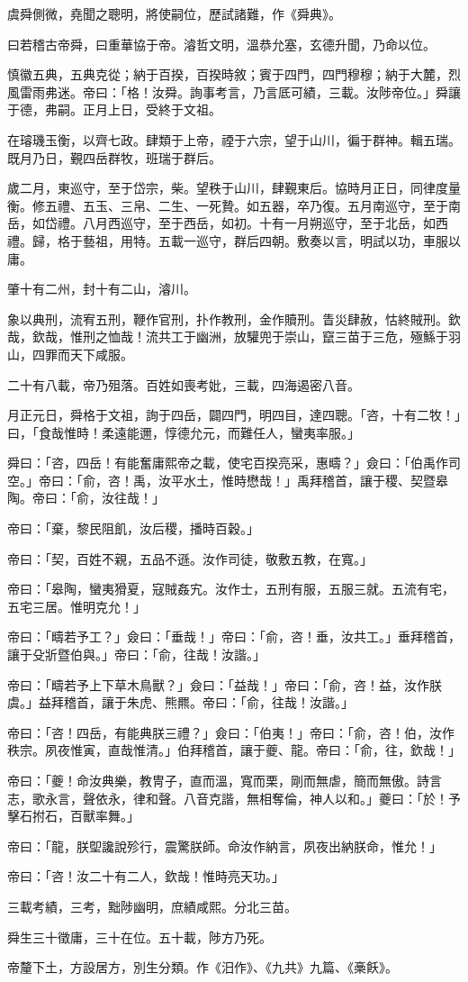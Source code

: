 
\begin{pinyinscope}
虞舜側微，堯聞之聰明，將使嗣位，歷試諸難，作《舜典》。

曰若稽古帝舜，曰重華協于帝。濬哲文明，溫恭允塞，玄德升聞，乃命以位。

慎徽五典，五典克從；納于百揆，百揆時敘；賓于四門，四門穆穆；納于大麓，烈風雷雨弗迷。帝曰：「格！汝舜。詢事考言，乃言厎可績，三載。汝陟帝位。」舜讓于德，弗嗣。正月上日，受終于文祖。

在璿璣玉衡，以齊七政。肆類于上帝，禋于六宗，望于山川，徧于群神。輯五瑞。既月乃日，覲四岳群牧，班瑞于群后。

歲二月，東巡守，至于岱宗，柴。望秩于山川，肆覲東后。協時月正日，同律度量衡。修五禮、五玉、三帛、二生、一死贄。如五器，卒乃復。五月南巡守，至于南岳，如岱禮。八月西巡守，至于西岳，如初。十有一月朔巡守，至于北岳，如西禮。歸，格于藝祖，用特。五載一巡守，群后四朝。敷奏以言，明試以功，車服以庸。

肇十有二州，封十有二山，濬川。

象以典刑，流宥五刑，鞭作官刑，扑作教刑，金作贖刑。眚災肆赦，怙終賊刑。欽哉，欽哉，惟刑之恤哉！流共工于幽洲，放驩兜于崇山，竄三苗于三危，殛鯀于羽山，四罪而天下咸服。

二十有八載，帝乃殂落。百姓如喪考妣，三載，四海遏密八音。

月正元日，舜格于文祖，詢于四岳，闢四門，明四目，達四聰。「咨，十有二牧！」曰，「食哉惟時！柔遠能邇，惇德允元，而難任人，蠻夷率服。」

舜曰：「咨，四岳！有能奮庸熙帝之載，使宅百揆亮采，惠疇？」僉曰：「伯禹作司空。」帝曰：「俞，咨！禹，汝平水土，惟時懋哉！」禹拜稽首，讓于稷、契暨皋陶。帝曰：「俞，汝往哉！」

帝曰：「棄，黎民阻飢，汝后稷，播時百穀。」

帝曰：「契，百姓不親，五品不遜。汝作司徒，敬敷五教，在寬。」

帝曰：「皋陶，蠻夷猾夏，寇賊姦宄。汝作士，五刑有服，五服三就。五流有宅，五宅三居。惟明克允！」

帝曰：「疇若予工？」僉曰：「垂哉！」帝曰：「俞，咨！垂，汝共工。」垂拜稽首，讓于殳斨暨伯與。」帝曰：「俞，往哉！汝諧。」

帝曰：「疇若予上下草木鳥獸？」僉曰：「益哉！」帝曰：「俞，咨！益，汝作朕虞。」益拜稽首，讓于朱虎、熊羆。帝曰：「俞，往哉！汝諧。」

帝曰：「咨！四岳，有能典朕三禮？」僉曰：「伯夷！」帝曰：「俞，咨！伯，汝作秩宗。夙夜惟寅，直哉惟清。」伯拜稽首，讓于夔、龍。帝曰：「俞，往，欽哉！」

帝曰：「夔！命汝典樂，教冑子，直而溫，寬而栗，剛而無虐，簡而無傲。詩言志，歌永言，聲依永，律和聲。八音克諧，無相奪倫，神人以和。」夔曰：「於！予擊石拊石，百獸率舞。」

帝曰：「龍，朕堲讒說殄行，震驚朕師。命汝作納言，夙夜出納朕命，惟允！」

帝曰：「咨！汝二十有二人，欽哉！惟時亮天功。」

三載考績，三考，黜陟幽明，庶績咸熙。分北三苗。

舜生三十徵庸，三十在位。五十載，陟方乃死。

帝釐下土，方設居方，別生分類。作《汨作》、《九共》九篇、《槀飫》。


\end{pinyinscope}